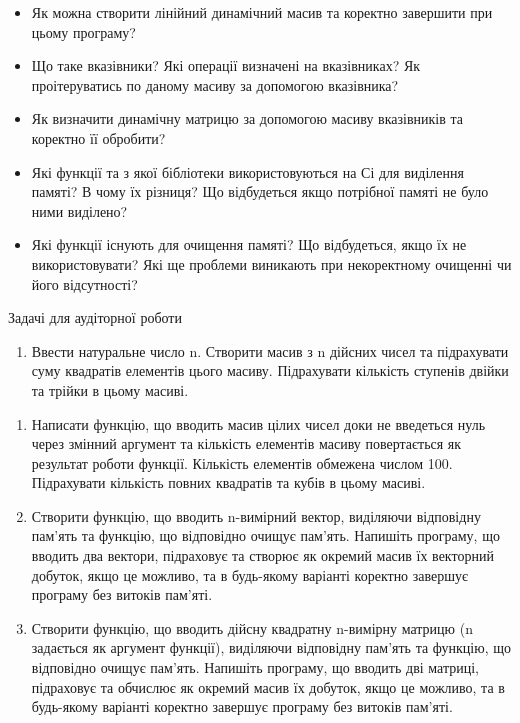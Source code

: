 \documentclass[]{article}
\begin{document}
\begin{itemize}
\item
  Як можна створити лінійний динамічний масив та коректно завершити при
  цьому програму?
\item
  Що таке вказівники? Які операції визначені на вказівниках? Як
  проітеруватись по даному масиву за допомогою вказівника?
\item
  Як визначити динамічну матрицю за допомогою масиву вказівників та
  коректно її обробити?
\item
  Які функції та з якої бібліотеки використовуються на Сі для виділення
  памяті? В чому їх різниця? Що відбудеться якщо потрібної памяті не
  було ними виділено?
\item
  Які функції існують для очищення памяті? Що відбудеться, якщо їх не
  використовувати? Які ще проблеми виникають при некоректному очищенні
  чи його відсутності?
\end{itemize}

Задачі для аудіторної роботи

\begin{enumerate}
\def\labelenumi{\arabic{enumi})}
\item
  Ввести натуральне число n. Створити масив з n дійсних чисел та
  підрахувати суму квадратів елементів цього масиву. Підрахувати
  кількість ступенів двійки та трійки в цьому масиві.
\end{enumerate}

\begin{enumerate}
\def\labelenumi{\arabic{enumi})}
\item
  Написати функцію, що вводить масив цілих чисел доки не введеться нуль
  через змінний аргумент та кількість елементів масиву повертається як
  результат роботи функції. Кількість елементів обмежена числом 100.
  Підрахувати кількість повних квадратів та кубів в цьому масиві.
\item
  Створити функцію, що вводить n-вимірний вектор, виділяючи відповідну
  пам'ять та функцію, що відповідно очищує пам'ять. Напишіть програму,
  що вводить два вектори, підраховує та створює як окремий масив їх
  векторний добуток, якщо це можливо, та в будь-якому варіанті коректно
  завершує програму без витоків пам'яті.
\item
  Створити функцію, що вводить дійсну квадратну n-вимірну матрицю (n
  задається як аргумент функції), виділяючи відповідну пам'ять та
  функцію, що відповідно очищує пам'ять. Напишіть програму, що вводить
  дві матриці, підраховує та обчислює як окремий масив їх добуток, якщо
  це можливо, та в будь-якому варіанті коректно завершує програму без
  витоків пам'яті.
\end{enumerate}
\end{document}
